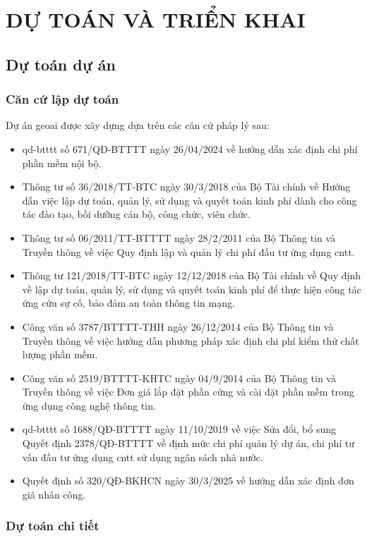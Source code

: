 \section{DỰ TOÁN VÀ TRIỂN KHAI}

\subsection{Dự toán dự án}

\subsubsection{Căn cứ lập dự toán}
Dự án \gls{geoai} được xây dựng dựa trên các căn cứ pháp lý sau:
\begin{itemize}
    \item \gls{qd-btttt} số 671/QĐ-BTTTT ngày 26/04/2024 về hướng dẫn xác định chi phí phần mềm nội bộ.
    \item Thông tư số 36/2018/TT-BTC ngày 30/3/2018 của Bộ Tài chính về Hướng dẫn việc lập dự toán, quản lý, sử dụng và quyết toán kinh phí dành cho công tác đào tạo, bồi dưỡng cán bộ, công chức, viên chức.
    \item Thông tư số 06/2011/TT-BTTTT ngày 28/2/2011 của Bộ Thông tin và Truyền thông về việc Quy định lập và quản lý chi phí đầu tư ứng dụng \gls{cntt}.
    \item Thông tư 121/2018/TT-BTC ngày 12/12/2018 của Bộ Tài chính về Quy định về lập dự toán, quản lý, sử dụng và quyết toán kinh phí để thực hiện công tác ứng cứu sự cố, bảo đảm an toàn thông tin mạng.
    \item Công văn số 3787/BTTTT-THH ngày 26/12/2014 của Bộ Thông tin và Truyền thông về việc hướng dẫn phương pháp xác định chi phí kiểm thử chất lượng phần mềm.
    \item Công văn số 2519/BTTTT-KHTC ngày 04/9/2014 của Bộ Thông tin và Truyền thông về việc Đơn giá lắp đặt phần cứng và cài đặt phần mềm trong ứng dụng công nghệ thông tin.
    \item \gls{qd-btttt} số 1688/QĐ-BTTTT ngày 11/10/2019 về việc Sửa đổi, bổ sung Quyết định 2378/QĐ-BTTTT về định mức chi phí quản lý dự án, chi phí tư vấn đầu tư ứng dụng \gls{cntt} sử dụng ngân sách nhà nước.
    \item Quyết định số 320/QĐ-BKHCN ngày 30/3/2025 về hướng dẫn xác định đơn giá nhân công.
\end{itemize}

\subsubsection{Dự toán chi tiết}

